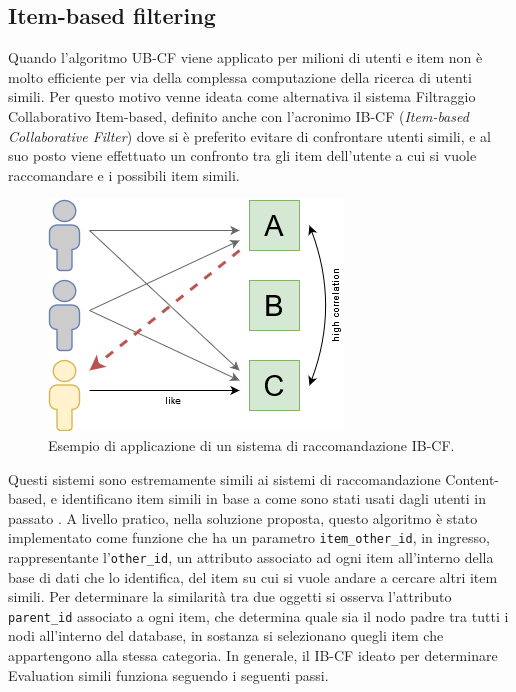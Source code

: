 \subsection{Item-based filtering}
Quando l'algoritmo UB-CF viene applicato per milioni di utenti e item non è molto efficiente per via della complessa computazione della 
ricerca di utenti simili. Per questo motivo venne ideata come alternativa il sistema Filtraggio Collaborativo Item-based, 
definito anche con l'acronimo IB-CF (\textit{Item-based Collaborative Filter}) dove si è preferito evitare di confrontare utenti 
simili, e al suo posto viene effettuato un confronto tra gli item dell'utente a cui si vuole raccomandare e i possibili item simili.
%
\begin{figure}[ht!]
    \centering
    \includegraphics[scale=0.5]{images/IB_CF_ex.png}
    \caption[Applicazione di un sistema di raccomandazione IB-CF]{Esempio di applicazione di un sistema di raccomandazione IB-CF.}
    \label{fig:IB_CF}
\end{figure}
\hfill\break
Questi sistemi sono estremamente simili ai sistemi di raccomandazione Content-based, e identificano item simili in base a come sono 
stati usati dagli utenti in passato \cite{item-based-collaborative-filtering}.\hfill\break
A livello pratico, nella soluzione proposta, questo algoritmo è stato implementato come funzione che ha un 
parametro \texttt{item\_other\_id}, in ingresso, rappresentante l'\texttt{other\_id}, un attributo associato ad ogni item all'interno della base di dati 
che lo identifica, del item su cui si vuole andare a cercare altri item simili. Per determinare la similarità tra due oggetti si osserva 
l'attributo \texttt{parent\_id} associato a ogni item, che determina quale sia il nodo padre tra tutti i nodi all'interno del database, in sostanza 
si selezionano quegli item che appartengono alla stessa categoria.\hfill\break
In generale, il IB-CF ideato per determinare Evaluation simili funziona seguendo i seguenti passi.
